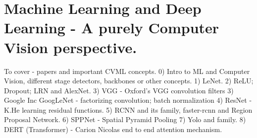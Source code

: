\section{Machine Learning and Deep Learning - A purely Computer Vision perspective.}

To cover - papers and important CVML concepts. 
0) Intro to ML and Computer Vision, different stage detectors, backbones or other concepts. 
1) LeNet. 
2) ReLU; Dropout; LRN and AlexNet. 
3) VGG - Oxford’s VGG convolution filters
3) Google Inc GoogLeNet - factorizing convolution;
batch normalization
4) ResNet - K.He learning residual functions. 
5) RCNN and its family, faster-rcnn and Region Proposal Network.  
6) SPPNet - Spatial Pyramid Pooling
7) Yolo and family. 
8) DERT (Transformer) - Carion Nicolas end to end attention mechanism.


